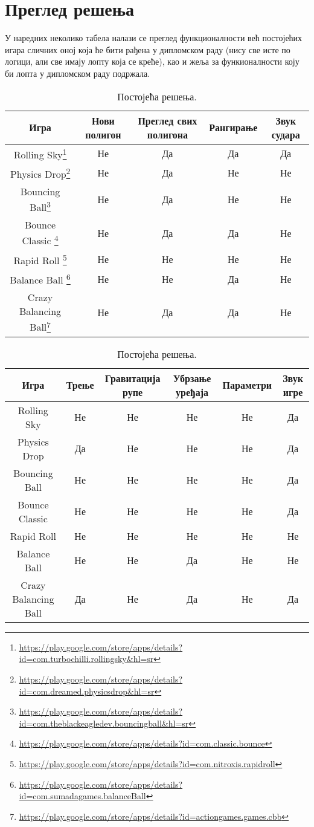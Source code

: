 \chapter{Преглед решења } \label{CurrentSolutions}

У наредних неколико табела налази се преглед функционалности већ постојећих игара сличних оној која ће бити рађена у дипломском раду (нису све исте по логици, али све имају лопту која се креће), као и жеља за функионалности коју би лопта у дипломском раду подржала.

\begin{table}[H]
\begin{tabular}{|c|c|c|c|c|}
\hline
Игра & Нови полигон & Преглед свих полигона& Рангирање & Звук судара \\
\hline
Rolling Sky\footnote{\url{https://play.google.com/store/apps/details?id=com.turbochilli.rollingsky&hl=sr}} & Не & Да &  Да& Да\\
Physics Drop\footnote{\url{https://play.google.com/store/apps/details?id=com.dreamed.physicsdrop&hl=sr}} & Не & Да &  Не & Не\\
Bouncing Ball\footnote{\url{https://play.google.com/store/apps/details?id=com.theblackeagledev.bouncingball&hl=sr}} & Не & Да &  Не& Не\\
Bounce Classic \footnote{\url{https://play.google.com/store/apps/details?id=com.classic.bounce}} & Не & Да &  Да& Не\\
Rapid Roll \footnote{\url{https://play.google.com/store/apps/details?id=com.nitroxis.rapidroll}} & Не & Не&  Не& Не\\
Balance Ball \footnote{\url{https://play.google.com/store/apps/details?id=com.sumadagames.balanceBall}} & Не & Не&  Да &Не\\
Crazy Balancing Ball\footnote{\url{https://play.google.com/store/apps/details?id=actiongames.games.cbb}} & Не & Да&  Да &Не\\
\hline
\end{tabular}

\caption{Постојећа решења.} \label{ExistingSolutions1}
\end{table}

\begin{table}[H]
\begin{tabular}{|c|c|c|c|c|c|}
\hline
Игра & Трење & Гравитација рупе& Убрзање уређаја& Параметри& Звук игре \\
\hline
Rolling Sky & Не & Не &  Не& Не&Да\\
Physics Drop & Да & Не &  Не & Не&Да\\
Bouncing Ball  & Не & Не&  Не& Не&Да\\
Bounce Classic  & Не & Не &  Не& Не&Да\\
Rapid Roll & Не & Не&  Не& Не&Не\\
Balance Ball  & Не & Не&  Да &Не&Не\\
Crazy Balancing Ball & Да & Не&  Да &Не&Да\\

\hline
\end{tabular}

\caption{Постојећа решења.} \label{ExistingSolutions2}
\end{table}



